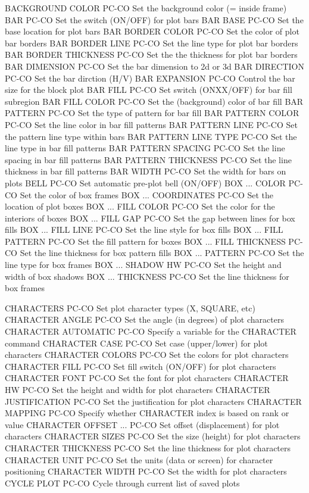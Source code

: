 BACKGROUND COLOR            PC-CO Set the background color (= inside frame)
BAR                         PC-CO Set the switch (ON/OFF) for plot bars
BAR BASE                    PC-CO Set the base location for plot bars
BAR BORDER COLOR            PC-CO Set the color of plot bar borders
BAR BORDER LINE             PC-CO Set the line type for plot bar borders
BAR BORDER THICKNESS        PC-CO Set the the thickness for plot bar borders
BAR DIMENSION               PC-CO Set the bar dimension to 2d or 3d
BAR DIRECTION               PC-CO Set the bar dirction (H/V)
BAR EXPANSION               PC-CO Control the bar size for the block plot
BAR FILL                    PC-CO Set switch (ONXX/OFF) for bar fill subregion
BAR FILL COLOR              PC-CO Set the (background) color of bar fill
BAR PATTERN                 PC-CO Set the type of pattern for bar fill
BAR PATTERN COLOR           PC-CO Set the line color in bar fill patterns
BAR PATTERN LINE            PC-CO Set the pattern line type within bars
BAR PATTERN LINE TYPE       PC-CO Set the line type in bar fill patterns
BAR PATTERN SPACING         PC-CO Set the line spacing in bar fill patterns
BAR PATTERN THICKNESS       PC-CO Set the line thickness in bar fill patterns
BAR WIDTH                   PC-CO Set the width for bars on plots
BELL                        PC-CO Set automatic pre-plot bell (ON/OFF)
BOX ... COLOR               PC-CO Set the color of box frames
BOX ... COORDINATES         PC-CO Set the location of plot boxes
BOX ... FILL COLOR          PC-CO Set the color for the interiors of boxes
BOX ... FILL GAP            PC-CO Set the gap between lines for box fills
BOX ... FILL LINE           PC-CO Set the line style for box fills
BOX ... FILL PATTERN        PC-CO Set the fill pattern for boxes
BOX ... FILL THICKNESS      PC-CO Set the line thickness for box pattern fills
BOX ... PATTERN             PC-CO Set the line type for box frames
BOX ... SHADOW HW           PC-CO Set the height and width of box shadows
BOX ... THICKNESS           PC-CO Set the line thickness for box frames

CHARACTERS                  PC-CO Set plot character types (X, SQUARE, etc)
CHARACTER ANGLE             PC-CO Set the angle (in degrees) of plot characters
CHARACTER AUTOMATIC         PC-CO Specify a variable for the CHARACTER command
CHARACTER CASE              PC-CO Set case (upper/lower) for plot characters
CHARACTER COLORS            PC-CO Set the colors for plot characters
CHARACTER FILL              PC-CO Set fill switch (ON/OFF) for plot characters
CHARACTER FONT              PC-CO Set the font for plot characters
CHARACTER HW                PC-CO Set the height and width for plot characters
CHARACTER JUSTIFICATION     PC-CO Set the justification for plot characters
CHARACTER MAPPING           PC-CO Specify whether CHARACTER index is based on rank or value
CHARACTER OFFSET ...        PC-CO Set offset (displacement) for plot characters
CHARACTER SIZES             PC-CO Set the size (height) for plot characters
CHARACTER THICKNESS         PC-CO Set the line thickness for plot characters
CHARACTER UNIT              PC-CO Set the units (data or screen) for character positioning
CHARACTER WIDTH             PC-CO Set the width for plot characters
CYCLE PLOT                  PC-CO Cycle through current list of saved plots

